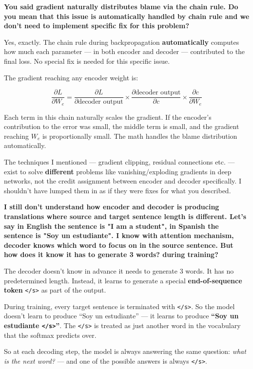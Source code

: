 \textbf{You said gradient naturally distributes blame via the chain rule. Do you mean that this issue is automatically handled by chain rule and we don't need to implement specific fix for this problem?}

Yes, exactly. The chain rule during backpropagation \textbf{automatically} computes how much each parameter --- in both encoder and decoder --- contributed to the final loss. No special fix is needed for this specific issue.

The gradient reaching any encoder weight is:

$$\frac{\partial L}{\partial W_e} = \frac{\partial L}{\partial \text{decoder output}} \times \frac{\partial \text{decoder output}}{\partial c} \times \frac{\partial c}{\partial W_e}$$

Each term in this chain naturally scales the gradient. If the encoder's contribution to the error was small, the middle term is small, and the gradient reaching $W_e$ is proportionally small. The math handles the blame distribution automatically.

The techniques I mentioned --- gradient clipping, residual connections etc. --- exist to solve \textbf{different} problems like vanishing/exploding gradients in deep networks, not the credit assignment between encoder and decoder specifically. I shouldn't have lumped them in as if they were fixes for what you described.

\bigskip

\textbf{I still don't understand how encoder and decoder is producing translations where source and target sentence length is different. Let's say in English the sentence is "I am a student", in Spanish the sentence is "Soy un estudiante". I know with attention mechanism, decoder knows which word to focus on in the source sentence. But how does it know it has to generate 3 words? during training?}

The decoder doesn't know in advance it needs to generate 3 words. It has no predetermined length. Instead, it learns to generate a special \textbf{end-of-sequence token} \texttt{</s>} as part of the output.

During training, every target sentence is terminated with \texttt{</s>}. So the model doesn't learn to produce ``Soy un estudiante'' --- it learns to produce \textbf{``Soy un estudiante \texttt{</s>}''}. The \texttt{</s>} is treated as just another word in the vocabulary that the softmax predicts over.

So at each decoding step, the model is always answering the same question: \textit{what is the next word?} --- and one of the possible answers is always \texttt{</s>}.

